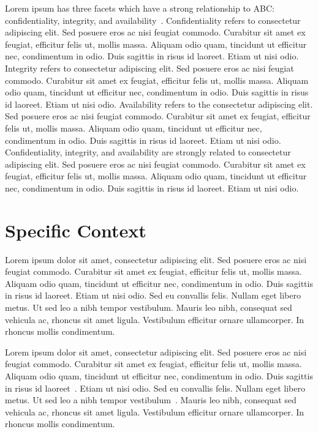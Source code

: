 Lorem ipsum has three facets which have a strong relationship to ABC: confidentiality, integrity, and availability~\cite{Bishop2002aa}. Confidentiality refers to consectetur adipiscing elit. Sed posuere eros ac nisi feugiat commodo. Curabitur sit amet ex feugiat, efficitur felis ut, mollis massa. Aliquam odio quam, tincidunt ut efficitur nec, condimentum in odio. Duis sagittis in risus id laoreet. Etiam ut nisi odio. Integrity refers to consectetur adipiscing elit. Sed posuere eros ac nisi feugiat commodo. Curabitur sit amet ex feugiat, efficitur felis ut, mollis massa. Aliquam odio quam, tincidunt ut efficitur nec, condimentum in odio. Duis sagittis in risus id laoreet. Etiam ut nisi odio. Availability refers to the consectetur adipiscing elit. Sed posuere eros ac nisi feugiat commodo. Curabitur sit amet ex feugiat, efficitur felis ut, mollis massa. Aliquam odio quam, tincidunt ut efficitur nec, condimentum in odio. Duis sagittis in risus id laoreet. Etiam ut nisi odio. Confidentiality, integrity, and availability are strongly related to consectetur adipiscing elit. Sed posuere eros ac nisi feugiat commodo. Curabitur sit amet ex feugiat, efficitur felis ut, mollis massa. Aliquam odio quam, tincidunt ut efficitur nec, condimentum in odio. Duis sagittis in risus id laoreet. Etiam ut nisi odio. \newline


\section{Specific Context}
\label{sec:specific_context}

Lorem ipsum dolor sit amet, consectetur adipiscing elit. Sed posuere eros ac nisi feugiat commodo. Curabitur sit amet ex feugiat, efficitur felis ut, mollis massa. Aliquam odio quam, tincidunt ut efficitur nec, condimentum in odio. Duis sagittis in risus id laoreet. Etiam ut nisi odio. Sed eu convallis felis. Nullam eget libero metus. Ut sed leo a nibh tempor vestibulum. Mauris leo nibh, consequat sed vehicula ac, rhoncus sit amet ligula. Vestibulum efficitur ornare ullamcorper. In rhoncus mollis condimentum. \newline

Lorem ipsum dolor sit amet, consectetur adipiscing elit. Sed posuere eros ac nisi feugiat commodo. Curabitur sit amet ex feugiat, efficitur felis ut, mollis massa. Aliquam odio quam, tincidunt ut efficitur nec, condimentum in odio. Duis sagittis in risus id laoreet~\cite{Lampson1973aa}. Etiam ut nisi odio. Sed eu convallis felis. Nullam eget libero metus. Ut sed leo a nibh tempor vestibulum~\cite{Kemmerer1983aa}. Mauris leo nibh, consequat sed vehicula ac, rhoncus sit amet ligula. Vestibulum efficitur ornare ullamcorper. In rhoncus mollis condimentum. \newline

